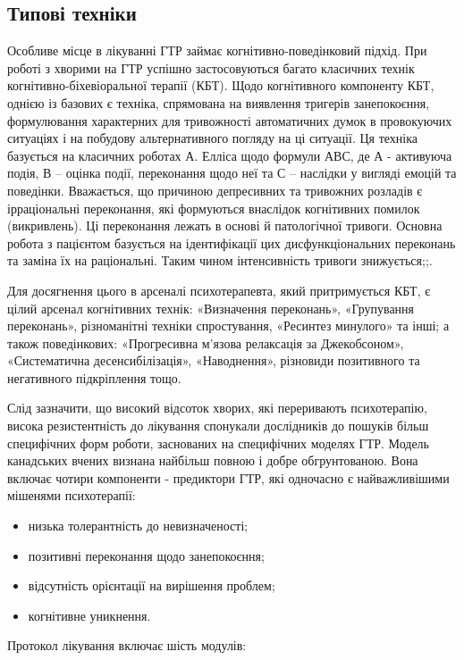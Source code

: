 \documentclass[twocolumn]{article}
\begin{document}
\subsection{Типові техніки}
\par Особливе місце в лікуванні ГТР займає когнітивно-поведінковий підхід. При роботі з хворими на ГТР успішно застосовуються багато класичних технік когнітивно-біхевіоральної терапії (КБТ). Щодо когнітивного компоненту КБТ, однією із базових є техніка, спрямована на виявлення тригерів занепокоєння, формулювання характерних для тривожності автоматичних думок в провокуючих ситуаціях і на побудову альтернативного погляду на ці ситуації. Ця техніка базується на класичних роботах А. Елліса щодо формули АВС, де А - активуюча подія, В – оцінка події, переконання щодо неї та С – наслідки у вигляді емоцій та поведінки. Вважається, що причиною депресивних та тривожних розладів є ірраціональні переконання, які формуються внаслідок когнітивних помилок (викривлень). Ці переконання лежать в основі й патологічної тривоги. Основна робота з пацієнтом базується на ідентифікації цих дисфункціональних переконань та заміна їх на раціональні. Таким чином інтенсивність тривоги знижується\cite{bib12};\cite{bib13};\cite{bib14}.
\par Для досягнення цього в арсеналі психотерапевта, який притримується КБТ, є цілий арсенал когнітивних технік: «Визначення переконань», «Групування переконань», різноманітні техніки спростування, «Ресинтез минулого» та інші; а також поведінкових: «Прогресивна м'язова релаксація за Джекобсоном», «Систематична десенсибілізація», «Наводнення», різновиди позитивного та негативного підкріплення тощо.
\par Слід зазначити, що високий відсоток хворих, які переривають психотерапію, висока резистентність до лікування спонукали дослідників до пошуків більш специфічних форм роботи, заснованих на специфічних моделях ГТР. Модель канадських вчених визнана найбільш повною і добре обгрунтованою\cite{bib11}. Вона включає чотири компоненти - предиктори ГТР, які одночасно є найважливішими мішенями психотерапії:
\begin{itemize}
\item низька толерантність до невизначеності;
\item позитивні переконання щодо занепокоєння;
\item відсутність орієнтації на вирішення проблем;
\item когнітивне уникнення.
\end{itemize}
\par Протокол лікування включає шість модулів:
\end{document}
